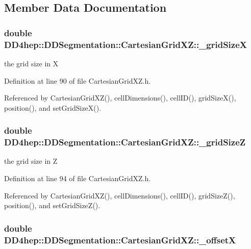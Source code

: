 \subsection{Member Data Documentation}
\hypertarget{class_d_d4hep_1_1_d_d_segmentation_1_1_cartesian_grid_x_z_a1ecb47b3c00cafed8fae40bb9bca2180}{
\subsubsection[{\_\-gridSizeX}]{\setlength{\rightskip}{0pt plus 5cm}double {\bf DD4hep::DDSegmentation::CartesianGridXZ::\_\-gridSizeX}}}
\label{class_d_d4hep_1_1_d_d_segmentation_1_1_cartesian_grid_x_z_a1ecb47b3c00cafed8fae40bb9bca2180}


the grid size in X 

Definition at line 90 of file CartesianGridXZ.h.

Referenced by CartesianGridXZ(), cellDimensions(), cellID(), gridSizeX(), position(), and setGridSizeX().\hypertarget{class_d_d4hep_1_1_d_d_segmentation_1_1_cartesian_grid_x_z_a7de343951b44cd52f5953f6f016d0e25}{
\subsubsection[{\_\-gridSizeZ}]{\setlength{\rightskip}{0pt plus 5cm}double {\bf DD4hep::DDSegmentation::CartesianGridXZ::\_\-gridSizeZ}}}
\label{class_d_d4hep_1_1_d_d_segmentation_1_1_cartesian_grid_x_z_a7de343951b44cd52f5953f6f016d0e25}


the grid size in Z 

Definition at line 94 of file CartesianGridXZ.h.

Referenced by CartesianGridXZ(), cellDimensions(), cellID(), gridSizeZ(), position(), and setGridSizeZ().\hypertarget{class_d_d4hep_1_1_d_d_segmentation_1_1_cartesian_grid_x_z_aa6bb5820863cb39d75382042623e0b6c}{
\subsubsection[{\_\-offsetX}]{\setlength{\rightskip}{0pt plus 5cm}double {\bf DD4hep::DDSegmentation::CartesianGridXZ::\_\-offsetX}}}
\label{class_d_d4hep_1_1_d_d_segmentation_1_1_cartesian_grid_x_z_aa6bb5820863cb39d75382042623e0b6c}


